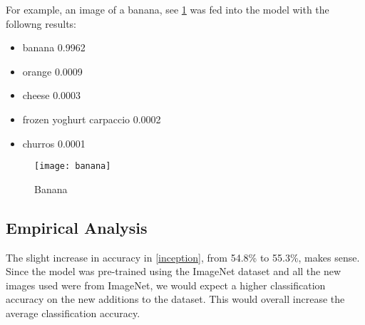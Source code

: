 For example, an image of a banana, see \ref{fig:banana} was fed into the model with
the followng results:
\begin{itemize}
    \item{banana 0.9962}
    \item{orange 0.0009}
    \item{cheese 0.0003}
    \item{frozen yoghurt carpaccio 0.0002}
    \item{churros 0.0001}
\end{itemize}
 
\begin{figure}
    \texttt{[image: banana]}
    \caption{Banana}
    \label{fig:banana}
\end{figure}

\subsection*{Empirical Analysis}
The slight increase in accuracy in \ref{inception}, from 54.8\% to 55.3\%, makes
sense. Since the model was pre-trained using the ImageNet dataset and all the
new images used were from ImageNet, we would expect a higher classification
accuracy on the new additions to the dataset. This would overall increase the
average classification accuracy.
